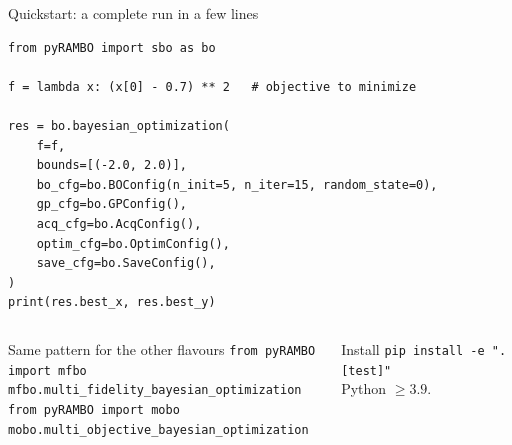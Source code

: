 \documentclass[aspectratio=169,10pt]{beamer}
\newcommand{\code}[1]{\texttt{#1}}
\begin{document}
\begin{frame}[fragile]{Quickstart: a complete run in a few lines}
\begin{lstlisting}
from pyRAMBO import sbo as bo

f = lambda x: (x[0] - 0.7) ** 2   # objective to minimize

res = bo.bayesian_optimization(
    f=f,
    bounds=[(-2.0, 2.0)],
    bo_cfg=bo.BOConfig(n_init=5, n_iter=15, random_state=0),
    gp_cfg=bo.GPConfig(),
    acq_cfg=bo.AcqConfig(),
    optim_cfg=bo.OptimConfig(),
    save_cfg=bo.SaveConfig(),
)
print(res.best_x, res.best_y)
\end{lstlisting}
  \begin{columns}[T]
    \begin{block}{Same pattern for the other flavours}
      \footnotesize
      \code{from pyRAMBO import mfbo}\\
      \code{mfbo.multi\_fidelity\_bayesian\_optimization}\\[1mm]
      \code{from pyRAMBO import mobo}\\
      \code{mobo.multi\_objective\_bayesian\_optimization}
    \end{block}
    \begin{block}{Install}
      \footnotesize
      \code{pip install -e ".[test]"}\\
      Python $\ge 3.9$.
    \end{block}
  \end{columns}
\end{frame}
\end{document}
